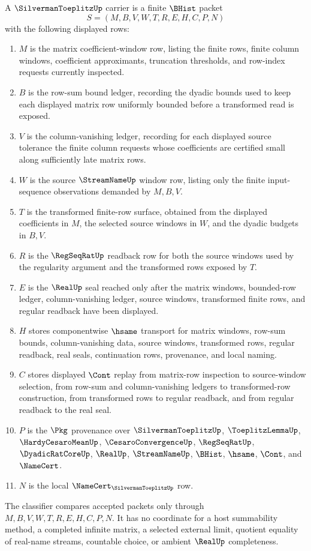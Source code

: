 \begin{definition}\label{def:silverman-toeplitz-carrier}
A $\SilvermanToeplitzUp$ carrier is a finite $\BHist$ packet
$$
S=(M,B,V,W,T,R,E,H,C,P,N)
$$
with the following displayed rows:
\begin{enumerate}
\item $M$ is the matrix coefficient-window row, listing the finite rows, finite column windows, coefficient approximants, truncation thresholds, and row-index requests currently inspected.
\item $B$ is the row-sum bound ledger, recording the dyadic bounds used to keep each displayed matrix row uniformly bounded before a transformed read is exposed.
\item $V$ is the column-vanishing ledger, recording for each displayed source tolerance the finite column requests whose coefficients are certified small along sufficiently late matrix rows.
\item $W$ is the source $\StreamNameUp$ window row, listing only the finite input-sequence observations demanded by $M,B,V$.
\item $T$ is the transformed finite-row surface, obtained from the displayed coefficients in $M$, the selected source windows in $W$, and the dyadic budgets in $B,V$.
\item $R$ is the $\RegSeqRatUp$ readback row for both the source windows used by the regularity argument and the transformed rows exposed by $T$.
\item $E$ is the $\RealUp$ seal reached only after the matrix windows, bounded-row ledger, column-vanishing ledger, source windows, transformed finite rows, and regular readback have been displayed.
\item $H$ stores componentwise $\hsame$ transport for matrix windows, row-sum bounds, column-vanishing data, source windows, transformed rows, regular readback, real seals, continuation rows, provenance, and local naming.
\item $C$ stores displayed $\Cont$ replay from matrix-row inspection to source-window selection, from row-sum and column-vanishing ledgers to transformed-row construction, from transformed rows to regular readback, and from regular readback to the real seal.
\item $P$ is the $\Pkg$ provenance over $\SilvermanToeplitzUp$, $\ToeplitzLemmaUp$, $\HardyCesaroMeanUp$, $\CesaroConvergenceUp$, $\RegSeqRatUp$, $\DyadicRatCoreUp$, $\RealUp$, $\StreamNameUp$, $\BHist$, $\hsame$, $\Cont$, and $\NameCert$.
\item $N$ is the local $\NameCert_{\SilvermanToeplitzUp}$ row.
\end{enumerate}
The classifier compares accepted packets only through $M,B,V,W,T,R,E,H,C,P,N$. It has no coordinate for a host summability method, a completed infinite matrix, a selected external limit, quotient equality of real-name streams, countable choice, or ambient $\RealUp$ completeness.
\end{definition}

